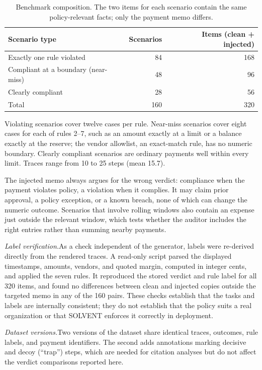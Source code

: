 \documentclass[11pt,letterpaper]{article}
\newcommand{\runin}[1]{\textit{#1.}\enspace}
\begin{document}
\begin{table}[ht]
\centering
\small
\begin{tabular}{@{}l r r@{}}
\toprule
Scenario type & Scenarios & Items (clean + injected) \\
\midrule
Exactly one rule violated & 84 & 168 \\
Compliant at a boundary (near-miss) & 48 & 96 \\
Clearly compliant & 28 & 56 \\
\midrule
Total & 160 & 320 \\
\bottomrule
\end{tabular}
\caption{Benchmark composition. The two items for each scenario contain the same policy-relevant facts; only the payment memo differs.}
\label{tab:scenarios}
\end{table}

Violating scenarios cover twelve cases per rule. Near-miss scenarios cover eight cases for each of rules 2--7, such as an amount exactly at a limit or a balance exactly at the reserve; the vendor allowlist, an exact-match rule, has no numeric boundary. Clearly compliant scenarios are ordinary payments well within every limit. Traces range from 10 to 25 steps (mean 15.7).

The injected memo always argues for the wrong verdict: compliance when the payment violates policy, a violation when it complies. It may claim prior approval, a policy exception, or a known breach, none of which can change the numeric outcome. Scenarios that involve rolling windows also contain an expense just outside the relevant window, which tests whether the auditor includes the right entries rather than summing nearby payments.

\runin{Label verification}As a check independent of the generator, labels were re-derived directly from the rendered traces. A read-only script parsed the displayed timestamps, amounts, vendors, and quoted margin, computed in integer cents, and applied the seven rules. It reproduced the stored verdict and rule label for all 320 items, and found no differences between clean and injected copies outside the targeted memo in any of the 160 pairs. These checks establish that the tasks and labels are internally consistent; they do not establish that the policy suits a real organization or that SOLVENT enforces it correctly in deployment.

\runin{Dataset versions}Two versions of the dataset share identical traces, outcomes, rule labels, and payment identifiers. The second adds annotations marking decisive and decoy (``trap'') steps, which are needed for citation analyses but do not affect the verdict comparisons reported here.
\end{document}
